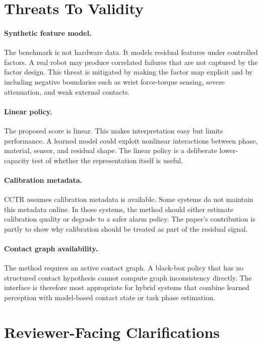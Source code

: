 \documentclass{article}
\newcommand{\method}{CCTR}
\begin{document}
\section{Threats To Validity}

\paragraph{Synthetic feature model.}
The benchmark is not hardware data. It models residual features under controlled factors. A real robot may produce correlated failures that are not captured by the factor design. This threat is mitigated by making the factor map explicit and by including negative boundaries such as wrist force-torque sensing, severe attenuation, and weak external contacts.

\paragraph{Linear policy.}
The proposed score is linear. This makes interpretation easy but limits performance. A learned model could exploit nonlinear interactions between phase, material, sensor, and residual shape. The linear policy is a deliberate lower-capacity test of whether the representation itself is useful.

\paragraph{Calibration metadata.}
\method{} assumes calibration metadata is available. Some systems do not maintain this metadata online. In those systems, the method should either estimate calibration quality or degrade to a safer alarm policy. The paper's contribution is partly to show why calibration should be treated as part of the residual signal.

\paragraph{Contact graph availability.}
The method requires an active contact graph. A black-box policy that has no structured contact hypothesis cannot compute graph inconsistency directly. The interface is therefore most appropriate for hybrid systems that combine learned perception with model-based contact state or task phase estimation.

\section{Reviewer-Facing Clarifications}
\end{document}

